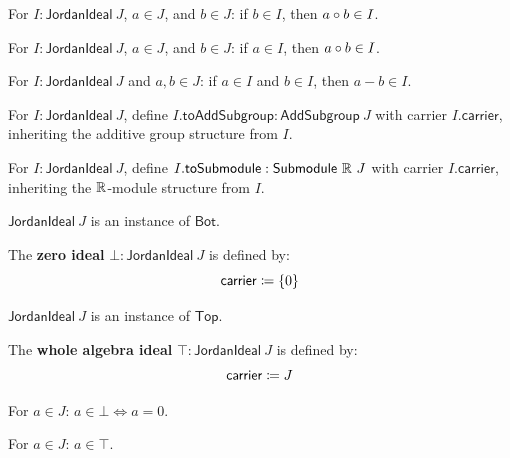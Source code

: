 \begin{theorem}
For $I : \mathsf{JordanIdeal}\ J$, $a \in J$, and $b \in J$: if $b \in I$, then $a \circ b \in I$.
\end{theorem}

\begin{theorem}
For $I : \mathsf{JordanIdeal}\ J$, $a \in J$, and $b \in J$: if $a \in I$, then $a \circ b \in I$.
\end{theorem}

\begin{theorem}
For $I : \mathsf{JordanIdeal}\ J$ and $a, b \in J$: if $a \in I$ and $b \in I$, then $a - b \in I$.
\end{theorem}

\begin{definition}[toAddSubgroup]
For $I : \mathsf{JordanIdeal}\ J$, define $I.\mathsf{toAddSubgroup} : \mathsf{AddSubgroup}\ J$ with carrier $I.\mathsf{carrier}$, inheriting the additive group structure from $I$.
\end{definition}

\begin{definition}[toSubmodule]
For $I : \mathsf{JordanIdeal}\ J$, define $I.\mathsf{toSubmodule} : \mathsf{Submodule}\ \mathbb{R}\ J$ with carrier $I.\mathsf{carrier}$, inheriting the $\mathbb{R}$-module structure from $I$.
\end{definition}

\begin{proposition}
$\mathsf{JordanIdeal}\ J$ is an instance of $\mathsf{Bot}$.
\end{proposition}

\begin{definition}[bot]
The \textbf{zero ideal} $\bot : \mathsf{JordanIdeal}\ J$ is defined by:
\[ \mathsf{carrier} \coloneqq \{0\} \]
\end{definition}

\begin{proposition}
$\mathsf{JordanIdeal}\ J$ is an instance of $\mathsf{Top}$.
\end{proposition}

\begin{definition}[top]
The \textbf{whole algebra ideal} $\top : \mathsf{JordanIdeal}\ J$ is defined by:
\[ \mathsf{carrier} \coloneqq J \]
\end{definition}

\begin{lemma}
For $a \in J$: $a \in \bot \iff a = 0$.
\end{lemma}

\begin{lemma}
For $a \in J$: $a \in \top$.
\end{lemma}

